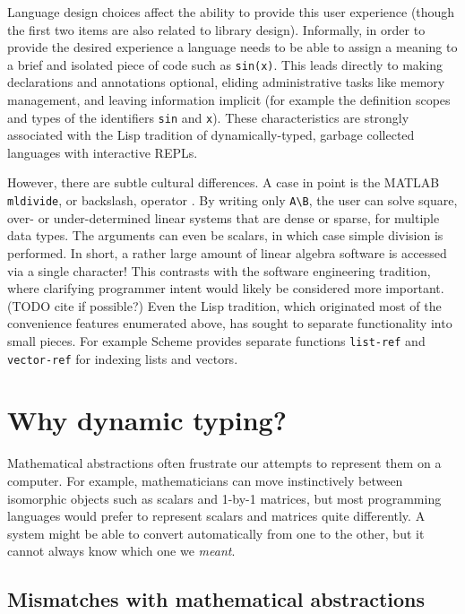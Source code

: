{Language design choices affect the ability to provide this
user experience (though the first two items are also related to
library design). Informally, in order to provide
the desired experience a language needs to be able to assign a
meaning to a brief and isolated piece of code such as \texttt{sin(x)}.
This leads directly to making declarations and annotations optional,
eliding administrative tasks like memory management, and leaving
information implicit (for example the definition scopes and types of the
identifiers \texttt{sin} and \texttt{x}).
These characteristics are strongly associated
with the Lisp tradition of dynamically-typed, garbage collected
languages with interactive REPLs.

However, there are subtle cultural differences. A case in point is the
MATLAB \texttt{mldivide}, or backslash, operator \cite{matlabman:mldivide}.
By writing only \texttt{A\textbackslash B}, the user can solve square,
over- or under-determined linear systems that are dense or sparse, for multiple
data types. The arguments can even be scalars, in which case simple
division is performed. In short, a rather large amount of linear algebra
software is accessed via a single character! This contrasts with the
software engineering tradition, where clarifying programmer intent would
likely be considered more important. (TODO cite if possible?)
Even the Lisp tradition, which originated most of the convenience features
enumerated above, has sought to separate functionality into small pieces.
For example Scheme provides separate functions \texttt{list-ref} and
\texttt{vector-ref} \cite{schemelang} for indexing lists and vectors.



\section{Why dynamic typing?}

Mathematical abstractions often frustrate our attempts to represent them
on a computer. For example, mathematicians can move instinctively between
isomorphic objects such as scalars and 1-by-1 matrices, but most programming
languages would prefer to represent scalars and matrices quite differently.
A system might be able to convert automatically from one to the other, but
it cannot always know which one we \emph{meant}.


\subsection{Mismatches with mathematical abstractions}

}
